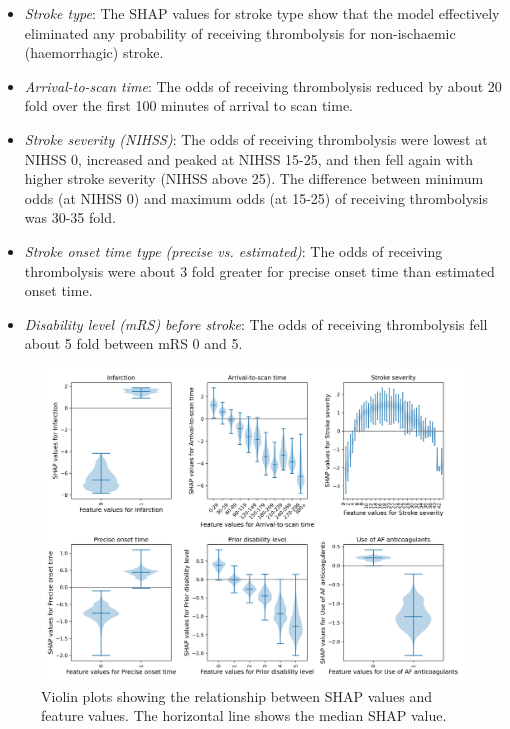 \begin{itemize}
    \item \emph{Stroke type}: The SHAP values for stroke type show that the model effectively eliminated any probability of receiving thrombolysis for non-ischaemic (haemorrhagic) stroke.
    \item \emph{Arrival-to-scan time}: The odds of receiving thrombolysis reduced by about 20 fold over the first 100 minutes of arrival to scan time.
    \item \emph{Stroke severity (NIHSS)}: The odds of receiving thrombolysis were lowest at NIHSS 0, increased and peaked at NIHSS 15-25, and then fell again with higher stroke severity (NIHSS above 25). The difference between minimum odds (at NIHSS 0) and maximum odds (at 15-25) of receiving thrombolysis was 30-35 fold.
    \item \emph{Stroke onset time type (precise vs. estimated)}: The odds of receiving thrombolysis were about 3 fold greater for precise onset time than estimated onset time.
    \item \emph{Disability level (mRS) before stroke}: The odds of receiving thrombolysis fell about 5 fold between mRS 0 and 5.
\end{itemize}

\begin{figure}[!h]
\centering
\includegraphics[width=1\textwidth]{./images/03_xgb_10_features_thrombolysis_shap_violin}
\caption{Violin plots showing the relationship between SHAP values and feature values. The horizontal line shows the median SHAP value.}
\label{fig:results_shap_violin}
\end{figure}

